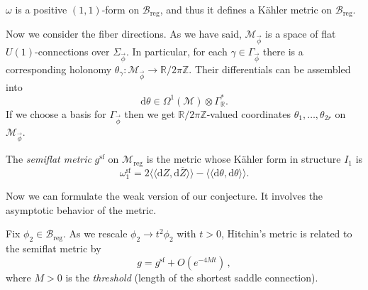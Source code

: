 \documentclass[12pt,letterpaper,reqno]{article}
\numberwithin{equation}{section}
\newcommand{\cB}{\ensuremath{\mathcal B}}
\newcommand{\cM}{\ensuremath{\mathcal M}}
\newcommand{\bbR}{\ensuremath{\mathbb R}}
\newcommand{\bbZ}{\ensuremath{\mathbb Z}}
\newcommand{\bbC}{\ensuremath{\mathbb C}}
\newcommand{\kahler}{K\"ahler\xspace}
\newcommand{\de}{\mathrm{d}}
\newcommand{\reg}{\mathrm{reg}}
\renewcommand{\sf}{\mathrm{sf}}
\newcommand{\gauge}{\mathrm{gauge}}
\newcommand{\IP}[1]{\langle#1\rangle}
\newcommand{\DIP}[1]{\langle\!\langle#1\rangle\!\rangle}
\newcommand{\vphi}{{\vec\phi}}
\newcommand{\ti}[1]{\textit{#1}}
\newcommand{\Sp}{\mathrm{Sp}}
\begin{document}
\begin{prop} $\omega$ is a
positive $(1,1)$-form on $\cB_\reg$, and thus it defines
a \kahler metric on $\cB_\reg$.
\end{prop}




Now we consider the fiber directions.
As we have said, $\cM_\vphi$ is a space of flat $U(1)$-connections
over $\Sigma_\vphi$. 
In particular, for each $\gamma \in \Gamma_\vphi$ 
there is a corresponding
holonomy $\theta_\gamma: \cM_\vphi \to \bbR / 2 \pi \bbZ$.
Their differentials can be assembled into
\begin{equation}
  \de \theta \in \Omega^1(\cM) \otimes \Gamma^*_\bbR.
\end{equation}
If we choose a basis for $\Gamma_\vphi$ 
then we get $\bbR / 2 \pi \bbZ$-valued coordinates $\theta_1, \dots, \theta_{2r}$
on $\cM_\vphi$.

\begin{defn}
The \ti{semiflat metric}  $g^\sf$ on $\cM_\reg$ is the metric 
whose \kahler form in structure $I_1$ is
\begin{equation} \label{eq:omega1-sf}
  \omega^\sf_1 = 2 \DIP{\de Z, \de \overline{Z}} - \DIP{\de \theta, \de \theta}.
\end{equation}
\end{defn}                                   

Now we can formulate the weak version of our conjecture.
It involves the asymptotic behavior of the metric.

\begin{conj}
Fix $\phi_2 \in \cB_\reg$.
As we rescale $\phi_2 \to t^2 \phi_2$ with $t > 0$,
Hitchin's metric is related to the semiflat metric by
\begin{equation}
  g = g^\sf + O(e^{-4 M t}) \, ,
\end{equation}
where $M > 0$ is the \ti{threshold} (length of the shortest saddle connection).
\end{conj}
\end{document}
